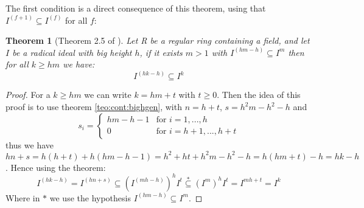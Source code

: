 \documentclass[notitlepage, a4]{book}
\theoremstyle{plain}
\newtheorem{teo}{Theorem}[section]
\theoremstyle{remark}
\theoremstyle{definition}
\newcommand{\Z}{\mathbb{Z}}
\newcommand{\cont}[2]{ I^{(#1)} \subseteq I^{#2}}
\newcounter{que}
\begin{document}
The first condition is a direct consequence of this theorem, using that $ \cont{f+1}{(f)} $ for all $ f $:

\begin{teo}[Theorem 2.5 of \cite{Grifo20}] \label{teo:cont:grifo1}
Let R be a regular ring containing a field, and let $ I $ be a radical ideal with big height $ h $, if it exists $ m>1 $ with $ \cont{hm -h}{m} $ then for all $ k \geq hm $ we have:
$$ \cont{hk - h}{k} $$
\end{teo}

\begin{proof}
For a $ k\geq hm  $ we can write $ k = hm + t $ with $ t\geq 0 $. Then the idea of this proof is to use theorem \ref{teo:cont:bighgen}, with $ n= h+ t $, $ s = h^2m - h^2 - h$ and 
\begin{equation}\label{eq:defsi}
s_i = \begin{cases}
hm-h-1 & \text{for } i = 1 , ... ,h\\
0 &\text{for }  i =h+1 , ..., h + t
\end{cases}
\end{equation}
thus we have $ hn + s = h(h+t) + h(hm-h-1)= h^2 + ht + h^2m - h^2 - h = h(hm + t) - h = hk - h$. Hence using the theorem:
\begin{equation}\label{eq:teo:grifo1}
I^{ ( hk - h)} = I^{ (hn + s)} \subseteq {( I^{ (mh -h ) } )}^h {I}^t \stackrel{*}{\subseteq} (I^m)^h I^t = I^{ mh +t} = I^k
\end{equation}
Where in $\ast$ we use the hypothesis $ \cont{hm-h}{m} $.
\end{proof}




 	
\end{document}
